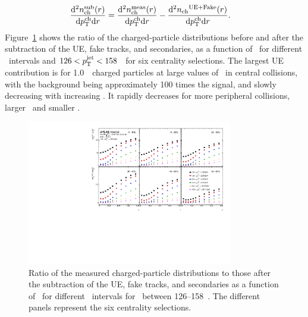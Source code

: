 \begin{align*}
\frac{\mathrm{d}^2 \mbox{$n_{\mathrm{ch}}^{\mathrm{sub}}$} (r) }{ \mathrm{d} \mbox{$p_{\mathrm{T}}^{\mathrm{ch}}$} \mathrm{d} r } &=  \frac{\mathrm{d}^2 \mbox{$n_{\mathrm{ch}}^{\mathrm{meas}}$}  (r) }{ \mathrm{d} \mbox{$p_{\mathrm{T}}^{\mathrm{ch}}$} \mathrm{d} r} -  \frac{ \mathrm{d}^2 \mbox{$n_{\mathrm{ch}}$}^{\mathrm{UE+Fake}}(r)  }{ \mathrm{d} \mbox{$p_{\mathrm{T}}^{\mathrm{ch}}$} \mathrm{d} r}.
\end{align*}
Figure~\ref{fig:UEsize} shows the ratio of the charged-particle distributions before and after the subtraction of the UE, fake tracks, and secondaries, as a function of \rvar\ for different \pttrk\ intervals and $126 < \mbox{$p_{\mathrm{T}}^{\mathrm{jet}}$} < 158$ \GeV\ for six centrality selections.
The largest UE contribution is for 1.0~\GeV\ charged particles at large values of \rvar\ in central collisions, with the background being approximately 100 times the signal, and slowly decreasing with increasing \ptjet.
It rapidly decreases for more peripheral collisions, larger \pttrk\ and smaller \rvar.



\begin{figure}
\centerline{
 \includegraphics[width=0.8\textwidth]{figures/performance/UE_B2S_single_0} }
\caption{Ratio of the measured charged-particle distributions to those after the subtraction of the UE, fake tracks, and secondaries as a function of \rvar\ for different \pttrk\ intervals for \ptjet\ between 126--158~\GeV.
The different panels represent the six centrality selections.}
\label{fig:UEsize}
\end{figure}


